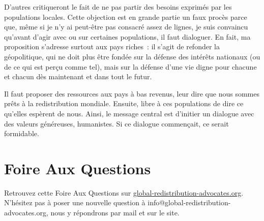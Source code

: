 \documentclass[a5paper,french,openany]{memoir}
\begin{document}
D'autres critiqueront le fait 
de ne pas partir des besoins exprimés par les populations locales. 
Cette objection est en grande partie un faux procès parce que, même si je n'y ai peut-être pas consacré assez de lignes, je suis convaincu qu'avant d'agir avec ou sur certaines populations, il faut dialoguer. En fait, ma proposition s'adresse surtout aux pays riches~: il s'agit de refonder la géopolitique, qui ne doit plus être fondée sur la défense des intérêts nationaux (ou de ce qui est perçu comme tel), mais sur la défense d'une vie digne pour chacune et chacun dès maintenant et dans tout le futur. 

Il faut proposer des ressources aux pays à bas revenus, leur dire que nous sommes prêts à la redistribution mondiale. Ensuite, libre à ces populations de dire ce qu'elles espèrent de nous. 
Ainsi, le message central est d'initier un dialogue avec des valeurs généreuses, humanistes. Si ce dialogue commençait, ce serait formidable. 

\chapter*{Foire Aux Questions}\label{ch:faq}

Retrouvez cette Foire Aux Questions sur \href{http://global-redistribution-advocates.org/}{global-redistribution-advocates.org}. N'hésitez pas à poser une nouvelle question à info@global-redistribution-advocates.org, nous y répondrons par mail et sur le site.
\end{document}
